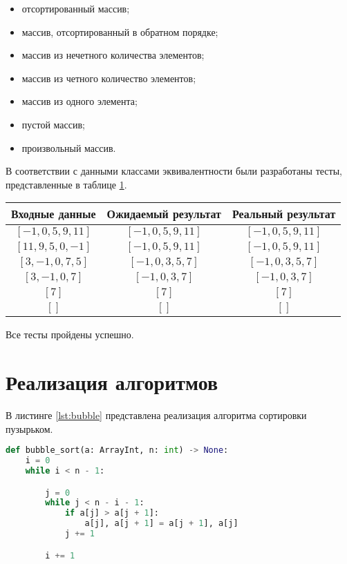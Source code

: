 \begin{itemize}
    \item отсортированный массив;
    \item массив, отсортированный в обратном порядке;
    \item массив из нечетного количества элементов;
    \item массив из четного количество элементов;
    \item массив из одного элемента;
    \item пустой массив;
    \item произвольный массив.
\end{itemize}

В соответствии с данными классами эквивалентности были разработаны тесты, представленные в таблице \ref{tab:tests}.
\begin{table}[h!]
	\begin{center}
		\begin{tabular}{|c|c|c|}
			\hline
			Входные данные & Ожидаемый результат & Реальный результат \\ 
            \hline
            $[-1, 0, 5, 9, 11]$ &
            $[-1, 0, 5, 9, 11]$ &
			$[-1, 0, 5, 9, 11]$ \\
            \hline
            $[11, 9, 5, 0, -1]$ &
            $[-1, 0, 5, 9, 11]$ &
			$[-1, 0, 5, 9, 11]$ \\
            \hline
            $[3, -1, 0, 7, 5]$ &
            $[-1, 0, 3, 5, 7]$ &
            $[-1, 0, 3, 5, 7]$ \\
            \hline
            $[3, -1, 0, 7]$ &
            $[-1, 0, 3, 7]$ &
            $[-1, 0, 3, 7]$ \\
            \hline
            $[7]$ &
            $[7]$ &
            $[7]$ \\
            \hline
            $[ ]$ &
            $[ ]$ &
            $[ ]$ \\
            \hline
        \end{tabular}
        \label{tab:tests}
	\end{center}
\end{table}

Все тесты пройдены успешно.

\section{Реализация алгоритмов}

В листинге \ref{lst:bubble} представлена реализация алгоритма сортировки пузырьком.
\begin{lstlisting}[style=mypython,label=lst:bubble,caption={Реализация алгоритма сортировки пузырьком},language=python]
def bubble_sort(a: ArrayInt, n: int) -> None:
    i = 0
    while i < n - 1:

        j = 0
        while j < n - i - 1:
            if a[j] > a[j + 1]:
                a[j], a[j + 1] = a[j + 1], a[j]
            j += 1

        i += 1
\end{lstlisting}


